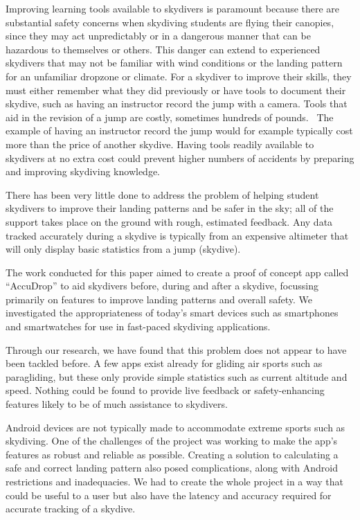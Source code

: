 Improving learning tools available to skydivers is paramount because there are substantial safety concerns when skydiving students are flying their canopies, since they may act unpredictably or in a dangerous manner that can be hazardous to themselves or others. This danger can extend to experienced skydivers that may not be familiar with wind conditions or the landing pattern for an unfamiliar dropzone or climate.
For a skydiver to improve their skills, they must either remember what they did previously or have tools to document their skydive, such as having an instructor record the jump with a camera. Tools that aid in the revision of a jump are costly, sometimes hundreds of pounds.~\cite{dekunu_dekunu_????} The example of having an instructor record the jump would for example typically cost more than the price of another skydive.
Having tools readily available to skydivers at no extra cost could prevent higher numbers of accidents by preparing and improving skydiving knowledge.

There has been very little done to address the problem of helping student skydivers to improve their landing patterns and be safer in the sky; all of the support takes place on the ground with rough, estimated feedback. Any data tracked accurately during a skydive is typically from an expensive altimeter that will only display basic statistics from a jump (skydive).

The work conducted for this paper aimed to create a proof of concept app called ``AccuDrop'' to aid skydivers before, during and after a skydive, focussing primarily on features to improve landing patterns and overall safety. We investigated the appropriateness of today's smart devices such as smartphones and smartwatches for use in fast-paced skydiving applications.

Through our research, we have found that this problem does not appear to have been tackled before. A few apps exist already for gliding air sports such as paragliding, but these only provide simple statistics such as current altitude and speed. Nothing could be found to provide live feedback or safety-enhancing features likely to be of much assistance to skydivers.

Android devices are not typically made to accommodate extreme sports such as skydiving. One of the challenges of the project was working to make the app's features as robust and reliable as possible. Creating a solution to calculating a safe and correct landing pattern also posed complications, along with Android restrictions and inadequacies. We had to create the whole project in a way that could be useful to a user but also have the latency and accuracy required for accurate tracking of a skydive.
